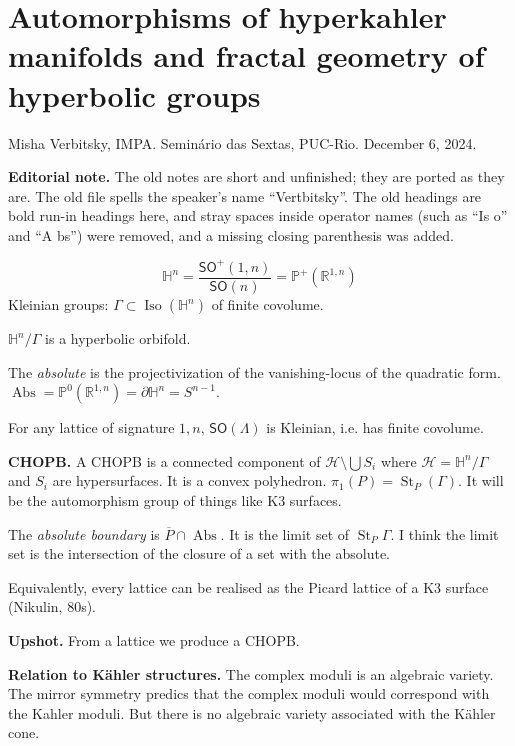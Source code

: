 \section{Automorphisms of hyperkahler
manifolds and fractal geometry of hyperbolic
groups}
\label{section-hk-fractal}

\noindent
Misha Verbitsky, IMPA.
Seminário das Sextas, PUC-Rio.
December 6, 2024.

\medskip\noindent
{\bf Editorial note.}
The old notes are short and unfinished; they
are ported as they are. The old file spells
the speaker's name ``Vertbitsky''. The old
headings are bold run-in headings here, and
stray spaces inside operator names (such as
``Is o'' and ``A bs'') were removed, and a
missing closing parenthesis was added.

$$
\mathbb{H}^n=
\frac{\mathsf{SO}^+(1,n)}{\mathsf{SO}(n)}=
\mathbb{P}^+(\mathbb{R}^{1,n})
$$
Kleinian groups: $\Gamma \subset
\operatorname{Iso}(\mathbb{H}^n)$ of finite
covolume.

$\mathbb{H}^n/\Gamma$ is a hyperbolic
orbifold.

The {\it absolute} is the projectivization of
the vanishing-locus of the quadratic form.
$\operatorname{Abs}=\mathbb{P}^0(
\mathbb{R}^{1,n})=\partial\mathbb{H}^n=
S^{n-1}$.

\begin{theorem}
\label{theorem-hf-harish-chandra}
For any lattice of signature $1,n$,
$\mathsf{SO}(\Lambda)$ is Kleinian, i.e. has
finite covolume.
\end{theorem}

\medskip\noindent
{\bf CHOPB.}
A CHOPB is a connected component of
$\mathcal{H}\setminus \bigcup S_i$ where
$\mathcal{H}=\mathbb{H}^n/\Gamma$ and $S_i$
are hypersurfaces. It is a convex polyhedron.
$\pi_1(P)=\operatorname{St}_P(\Gamma)$. It
will be the automorphism group of things like
K3 surfaces.

The {\it absolute boundary} is
$\overline{P}\cap \operatorname{Abs}$. It is
the limit set of $\operatorname{St}_P\Gamma$.
I think the limit set is the intersection of
the closure of a set with the absolute.

Equivalently, every lattice can be realised
as the Picard lattice of a K3 surface
(Nikulin, 80s).

\medskip\noindent
{\bf Upshot.}
From a lattice we produce a CHOPB.

\medskip\noindent
{\bf Relation to Kähler structures.}
The complex moduli is an algebraic variety.
The mirror symmetry predics that the complex
moduli would correspond with the Kahler
moduli. But there is no algebraic variety
associated with the Kähler cone.

